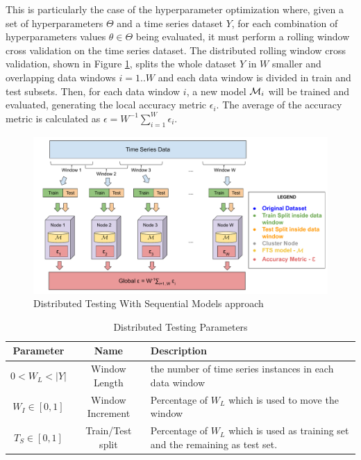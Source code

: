 This is particularly the case of the hyperparameter optimization where, given a set of hyperparameters $\Theta$ and a time series dataset $Y$, for each combination of hyperparameters values $\theta \in \Theta$ being evaluated, it must perform a rolling window cross validation on the time series dataset. The distributed rolling window cross validation, shown in Figure \ref{fig:distributed_testing}, splits the whole dataset $Y$ in $W$ smaller and overlapping data windows $i=1..W$ and each data window is divided in train and test subsets. Then, for each data window $i$, a new model $\mathcal{M}_i$ will be trained and evaluated, generating the local accuracy metric $\epsilon_i$. The average of the accuracy metric is calculated as $\epsilon = W^{-1} \sum_{i=1}^W \epsilon_i$.

\begin{figure}[htb]
    \centering
    \includegraphics[width=\textwidth]{figures/distributed_testing.pdf}
    \caption{Distributed Testing With Sequential Models approach}
    \label{fig:distributed_testing}
\end{figure}

\begin{table}[htb]
    \centering
    \begin{tabular}{|c|c|p{7cm}|} \hline
        \textbf{Parameter} & \textbf{Name} & \textbf{Description} \\ \hline
         $0 < W_L < |Y|$ & Window Length & the number of time series instances in each data window \\ \hline
         $W_I \in [0,1]$ & Window Increment & Percentage of $W_L$ which is used to move the window \\ \hline
         $T_S \in [0,1]$ & Train/Test split & Percentage of $W_L$ which is used as training set and the remaining as test set.  \\ \hline
    \end{tabular}
    \caption{Distributed Testing Parameters}
    \label{tab:distributed_testing}
\end{table}

